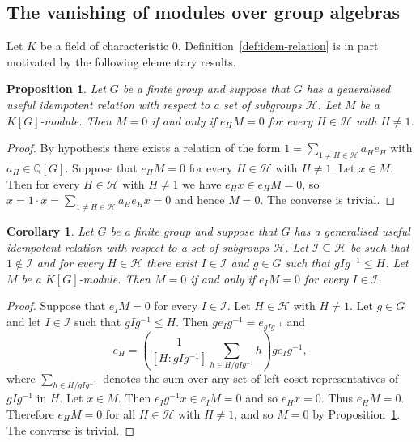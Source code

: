 \documentclass[12pt]{amsart}
\theoremstyle{plain}
\newtheorem{corollary}[theorem]{Corollary}
\newtheorem{prop}[theorem]{Proposition}
\theoremstyle{remark}
\theoremstyle{definition}
\newcommand{\Q}{\mathbb{Q}}
\numberwithin{equation}{section}
\begin{document}
\subsection{The vanishing of modules over group algebras}
Let $K$ be a field of characteristic $0$.
Definition~\ref{def:idem-relation} is in part motivated by the following elementary results.

\begin{prop}\label{prop:norm-relation-triv-mod}
Let $G$ be a finite group and suppose that $G$ has a generalised useful idempotent relation
with respect to a set of subgroups $\mathcal{H}$.
Let $M$ be a $K[G]$-module.
Then $M=0$ if and only if $e_{H}M=0$ for every $H \in \mathcal{H}$ with $H \neq 1$.
\end{prop}

\begin{proof}
By hypothesis there exists a relation of the form 
$1= \sum_{1 \neq H \in \mathcal{H}} a_{H}e_{H}$ with $a_{H} \in \Q[G]$.
Suppose that $e_{H}M=0$ for every $H \in \mathcal{H}$ with $H \neq 1$. Let $x \in M$.
Then for every $H \in \mathcal{H}$ with $H \neq 1$ we have $e_{H}x \in e_{H}M=0$,
so $x = 1\cdot x = \sum_{1 \neq H \in \mathcal{H}} a_{H}e_{H}x=0$ and hence $M=0$.
The converse is trivial.
\end{proof}

\begin{corollary}\label{cor:norm-sub-relation-triv-mod}
Let $G$ be a finite group and suppose that $G$ has a generalised useful idempotent relation
with respect to a set of subgroups $\mathcal{H}$.
Let $\mathcal{I} \subseteq \mathcal{H}$ be such that $1 \notin \mathcal{I}$ and for every $H \in \mathcal{H}$ there exist $I \in \mathcal{I}$ and $g \in G$ such that $gIg^{-1} \leq H$.
Let $M$ be a $K[G]$-module.
Then $M=0$ if and only if $e_{I}M=0$ for every $I \in \mathcal{I}$.  
\end{corollary}

\begin{proof}
Suppose that $e_{I}M=0$ for every $I \in \mathcal{I}$.
Let $H \in \mathcal{H}$ with $H \neq 1$. 
Let $g \in G$ and let $I \in \mathcal{I}$ such that $gIg^{-1} \leq H$.
Then $ge_{I}g^{-1}=e_{gIg^{-1}}$ and
\[
e_{H} = \left( \frac{1}{[H : {gIg^{-1}}]} \sum_{h \in H /{gIg^{-1}}} h \right) ge_{I}g^{-1},
\]
where $\sum_{h \in H /{gIg^{-1}}}$ denotes the sum over any set of left coset representatives of $gIg^{-1}$ in $H$.
Let $x \in M$. Then $e_{I}g^{-1}x \in e_{I}M=0$ and so $e_{H}x=0$. Thus $e_{H}M=0$.
Therefore $e_{H}M=0$ for all $H \in \mathcal{H}$ with $H \neq 1$,
and so $M=0$ by Proposition~\ref{prop:norm-relation-triv-mod}.
The converse is trivial.
\end{proof}
\end{document}
